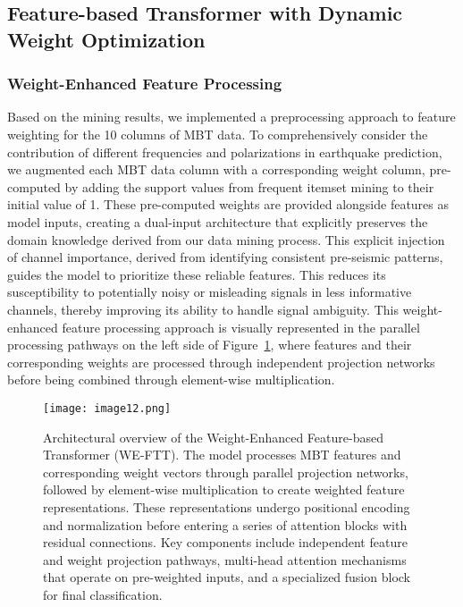 \documentclass[fleqn,10pt]{wlscirep_mdpi_style}
\begin{document}
\subsection{Feature-based Transformer with Dynamic Weight Optimization}
\subsubsection{Weight-Enhanced Feature Processing}
Based on the mining results, we implemented a preprocessing approach to feature weighting for the 10 columns of MBT data. To comprehensively consider the contribution of different frequencies and polarizations in earthquake prediction, we augmented each MBT data column with a corresponding weight column, pre-computed by adding the support values from frequent itemset mining to their initial value of 1. These pre-computed weights are provided alongside features as model inputs, creating a dual-input architecture that explicitly preserves the domain knowledge derived from our data mining process. This explicit injection of channel importance, derived from identifying consistent pre-seismic patterns, guides the model to prioritize these reliable features. This reduces its susceptibility to potentially noisy or misleading signals in less informative channels, thereby improving its ability to handle signal ambiguity. This weight-enhanced feature processing approach is visually represented in the parallel processing pathways on the left side of Figure~\ref{fig:fig12}, where features and their corresponding weights are processed through independent projection networks before being combined through element-wise multiplication.

\begin{figure}[!htbp]
\centering
\texttt{[image: image12.png]}
\caption{Architectural overview of the Weight-Enhanced Feature-based Transformer (WE-FTT). The model processes MBT features and corresponding weight vectors through parallel projection networks, followed by element-wise multiplication to create weighted feature representations. These representations undergo positional encoding and normalization before entering a series of attention blocks with residual connections. Key components include independent feature and weight projection pathways, multi-head attention mechanisms that operate on pre-weighted inputs, and a specialized fusion block for final classification.}
\label{fig:fig12}
\end{figure}
\end{document}
